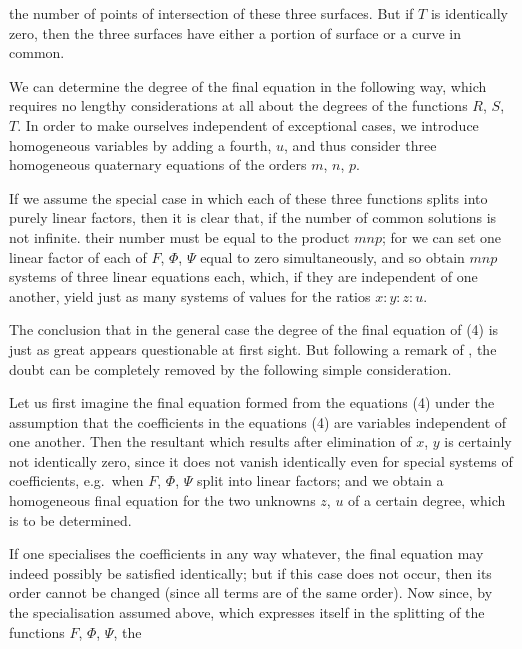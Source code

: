 

the number of points of intersection of these three surfaces. But if
$T$ is identically zero, then the three surfaces have either a
portion of surface or a curve in common.

We can determine the degree of the final equation in the following
way, which requires no lengthy considerations at all about the
degrees of the functions $R$, $S$, $T$. In order to make ourselves
independent of exceptional cases, we introduce homogeneous variables
by adding a fourth, $u$, and thus consider three homogeneous
quaternary equations
of the orders $m$, $n$, $p$.

If we assume the special case in which each of these three functions
splits into purely linear factors, then it is clear that, if the
number of common solutions is not infinite. %
their number must be
equal to the product $mnp$; for we can set one linear factor of each
of $F$, $\Phi$, $\Psi$ equal to zero simultaneously, and so obtain
$mnp$ systems of three linear equations each, which, if they are
independent of one another, yield just as many systems of values for
the ratios $x : y : z : u$.

The conclusion that in the general case the degree of the final
equation of (4) is just as great appears questionable at first
sight. But following a remark of , the doubt can
be completely removed by the following simple consideration.

Let us first imagine the final equation formed from the equations
(4) under the assumption that the coefficients in the equations (4)
are variables independent of one another. Then the resultant which
results after elimination of $x$, $y$ is certainly not identically
zero, since it does not vanish identically even for special systems
of coefficients, e.g.\ when $F$, $\Phi$, $\Psi$ split into linear
factors; and we obtain a homogeneous final equation for the two
unknowns $z$, $u$ of a certain degree, which is to be determined.

If one specialises the coefficients in any way whatever, the final
equation may indeed possibly be satisfied identically; but if this
case does not occur, then its order cannot be changed (since all
terms are of the same order). Now since, by the specialisation
assumed above, which expresses itself in the splitting of the
functions $F$, $\Phi$, $\Psi$, the
